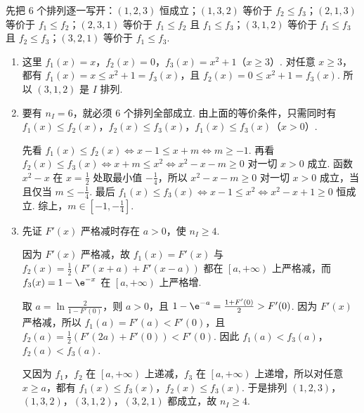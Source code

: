 \begin{solution}
先把 \( 6 \) 个排列逐一写开：\( \left( 1,2,3 \right) \) 恒成立；\( \left( 1,3,2 \right) \) 等价于 \( f_2\le f_3 \)；\( \left( 2,1,3 \right) \) 等价于 \( f_1\le f_2 \)；\( \left( 2,3,1 \right) \) 等价于 \( f_1\le f_2 \) 且 \( f_1\le f_3 \)；\( \left( 3,1,2 \right) \) 等价于 \( f_1\le f_3 \) 且 \( f_2\le f_3 \)；\( \left( 3,2,1 \right) \) 等价于 \( f_1\le f_3 \).

\begin{enumerate}
\item 这里 \( f_1(x)=x \)，\( f_2(x)=0 \)，\( f_3(x)=x^2+1 \)（\( x\ge 3 \)）. 对任意 \( x\ge 3 \)，都有 \( f_1(x)=x\le x^2+1=f_3(x) \)，且 \( f_2(x)=0\le x^2+1=f_3(x) \). 所以 \( \left( 3,1,2 \right) \) 是 \(I\) 排列.

\item 要有 \( n_I=6 \)，就必须 \( 6 \) 个排列全部成立. 由上面的等价条件，只需同时有 \( f_1(x)\le f_2(x) \)，\( f_2(x)\le f_3(x) \)，\( f_1(x)\le f_3(x) \)（\( x>0 \)）.

先看 \( f_1(x)\le f_2(x)\iff x-1\le x+m\iff m\ge -1 \).
再看 \( f_2(x)\le f_3(x)\iff x+m\le x^2\iff x^2-x-m\ge 0 \) 对一切 \( x>0 \) 成立. 函数 \( x^2-x \) 在 \( x=\frac{1}{2} \) 处取最小值 \( -\frac{1}{4} \)，所以 \( x^2-x-m\ge 0 \) 对一切 \( x>0 \) 成立，当且仅当 \( m\le -\frac{1}{4} \).
最后 \( f_1(x)\le f_3(x)\iff x-1\le x^2\iff x^2-x+1\ge 0 \) 恒成立.
综上，\( m\in \left[ -1,-\frac{1}{4} \right] \).

\item 先证 \( F'(x) \) 严格减时存在 \( a>0 \)，使 \( n_I\ge 4 \).

因为 \( F'(x) \) 严格减，故 \( f_1(x)=F'(x) \) 与 \( f_2(x)=\frac{1}{2}\left( F'\left( x+a \right)+F'\left( x-a \right) \right) \) 都在 \( \left[ a,+\infty \right) \) 上严格减，而 \( f_3(x)=1-\e^{-x} \) 在 \( \left[ a,+\infty \right) \) 上严格增.

取 \( a=\ln \frac{2}{1-F'(0)} \)，则 \( a>0 \)，且 \( 1-\e^{-a}=\frac{1+F'(0)}{2}>F'(0) \). 因为 \( F'(x) \) 严格减，所以 \( f_1(a)=F'(a)<F'(0) \)，且 \( f_2(a)=\frac{1}{2}\left( F'\left( 2a \right)+F'(0) \right)<F'(0) \). 因此 \( f_1(a)<f_3(a) \)，\( f_2(a)<f_3(a) \).

又因为 \( f_1 \)，\( f_2 \) 在 \( \left[ a,+\infty \right) \) 上递减，\( f_3 \) 在 \( \left[ a,+\infty \right) \) 上递增，所以对任意 \( x\ge a \)，都有 \( f_1(x)\le f_3(x) \)，\( f_2(x)\le f_3(x) \). 于是排列 \( \left( 1,2,3 \right) \)，\( \left( 1,3,2 \right) \)，\( \left( 3,1,2 \right) \)，\( \left( 3,2,1 \right) \) 都成立，故 \( n_I\ge 4 \).


\end{enumerate}
\end{solution}
